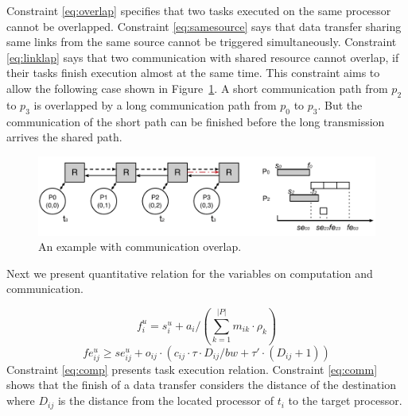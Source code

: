 Constraint \ref{eq:overlap} specifies that two tasks executed on the same processor cannot be overlapped. 
Constraint \ref{eq:samesource} says that data transfer sharing same links from the same source cannot be triggered simultaneously. 
Constraint \ref{eq:linklap} says that two communication with shared resource cannot overlap, if their tasks finish execution almost at the same time. This constraint aims to allow the following case shown in Figure~\ref{fig:overlap}. A short communication path from $p_2$ to $p_3$ is overlapped by a long communication path from $p_0$ to $p_3$. But the communication of the short path can be finished before the long transmission arrives the shared path. 
\begin{figure}[h]
\centering
 \includegraphics[width=0.85\columnwidth]{figures/overlap.pdf}%
  \caption{An example with communication overlap.}
 \label{fig:overlap}
 \end{figure}

Next we present quantitative relation for the variables on computation and communication.

\begin{equation}\label{eq:comp}
f^u_i = s^u_i + a_i/(\sum^{|P|}_{k=1} m_{ik}\cdot \rho_k)
\end{equation}
\begin{equation}\label{eq:comm}
fe^u_{ij} \geq se^u_{ij} +  o_{ij}\cdot(c_{ij} \cdot\tau\cdot  D_{ij}/bw+\tau'\cdot (D_{ij}+1))
\end{equation}
Constraint \ref{eq:comp} presents task execution relation.
Constraint \ref{eq:comm} shows that the finish of a data transfer considers the distance of the destination%
where $D_{ij}$ is the distance from the located processor of $t_i$ to the target processor. 

